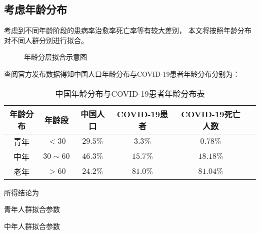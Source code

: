 \subsection{考虑年龄分布}
\par 考虑到不同年龄阶段的患病率治愈率死亡率等有较大差别，
本文将按照年龄分布对不同人群分别进行拟合。
\begin{figure}[H]
    \centering
    \caption{年龄分层拟合示意图}
\end{figure}
\par 查阅官方发布数据得知中国人口年龄分布与COVID-19患者年龄分布分别为：
\begin{table}[H]
    \centering
    \caption{中国年龄分布与COVID-19患者年龄分布表}
    \begin{tabular}{cccccc}
        \hline
        年龄分布 & 年龄段      & 中国人口 & COVID-19患者 & COVID-19死亡人数   \\
        \hline
        青年     & $<30$       & $29.5\%$ & $3.3\%$      & $0.78\%$         & \\
        中年     & $30\sim 60$ & $46.3\%$ & $15.7\%$     & $18.18\%$        & \\
        老年     & $>60$       & $24.2\%$ & $81.0\%$     & $81.04\%$        & \\
        \hline
    \end{tabular}
\end{table}
\par 所得结论为
\begin{table}[H]
    \centering
    \caption{青年人群拟合参数}
    
\end{table}
\begin{table}[H]
    \centering
    \caption{中年人群拟合参数}
    
\end{table}

